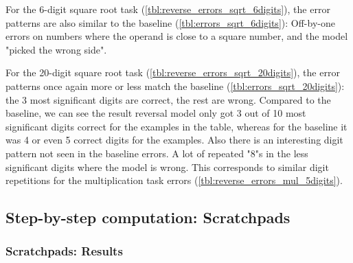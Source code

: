 For the 6-digit square root task (\cref{tbl:reverse_errors_sqrt_6digits}), the error patterns are also similar to the baseline (\cref{tbl:errors_sqrt_6digits}): Off-by-one errors on numbers where the operand is close to a square number, and the model "picked the wrong side".

For the 20-digit square root task (\cref{tbl:reverse_errors_sqrt_20digits}), the error patterns once again more or less match the baseline (\cref{tbl:errors_sqrt_20digits}): the 3 most significant digits are correct, the rest are wrong.
Compared to the baseline, we can see the result reversal model only got 3 out of 10 most significant digits correct for the examples in the table, whereas for the baseline it was 4 or even 5 correct digits for the examples.
Also there is an interesting digit pattern not seen in the baseline errors. A lot of repeated "8"s in the less significant digits where the model is wrong. This corresponds to similar digit repetitions for the multiplication task errors (\cref{tbl:reverse_errors_mul_5digits}).

\subsection{Step-by-step computation: Scratchpads}
\label{scratchpad}





\subsubsection{Scratchpads: Results}

\begin{table}[H]
	\begin{minipage}[t]{0.47\linewidth}
		\hfill
		\label{tbl:scratchpad_add}
	\end{minipage}
	\hfill %
	\begin{minipage}[t]{0.47\linewidth}
		\hfill
		\label{tbl:scratchpad_add_baseline}
	\end{minipage}
\end{table}


